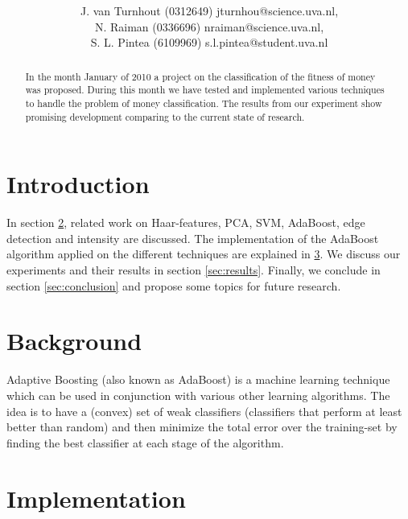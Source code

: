 \documentclass[11pt,twocolumn]{article}
\title{\tbf{Dirty Money:}\\\tbf{Feature selection using AdaBoost}}
\author{J. van Turnhout (0312649) jturnhou@science.uva.nl, \\ N. Raiman (0336696) nraiman@science.uva.nl, \\ S. L. Pintea (6109969) s.l.pintea@student.uva.nl}
\begin{document}
	\maketitle

	\begin{abstract}
	In the month January of 2010 a project on the classification of the fitness of money was proposed. During this month we have tested and implemented various techniques to handle the problem of money classification. The results from our experiment show promising development comparing to the current state of research.
	\end{abstract}


	\section{Introduction}

		In section \ref{sec:background}, related work on Haar-features, PCA, SVM, AdaBoost, edge detection and intensity are discussed. The implementation of the AdaBoost algorithm applied on the different techniques are explained in \ref{sec:implementation}. We discuss our experiments and their results in section \ref{sec:results}. Finally, we conclude in section \ref{sec:conclusion} and propose some topics for future research.
	
	\section{Background}\label{sec:background}
		Adaptive Boosting (also known as AdaBoost) is a machine learning technique which can be used in conjunction with various other learning algorithms. The idea is to have a (convex) set of weak classifiers (classifiers that perform at least better than random) and then minimize the total error over the training-set by finding the best classifier at each stage of the algorithm.

	\section{Implementation}\label{sec:implementation}
\end{document}
